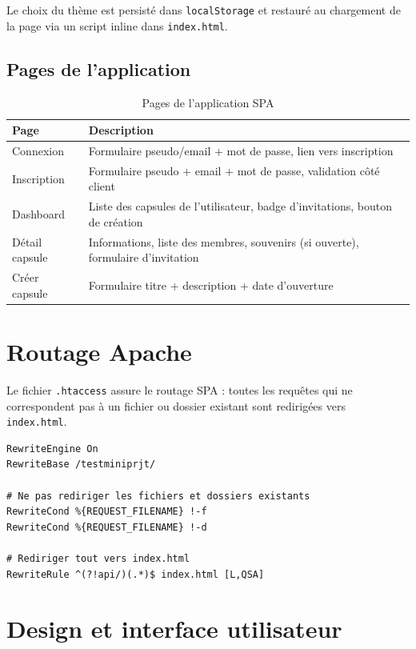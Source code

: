 \documentclass[12pt,a4paper]{report}
\begin{document}
Le choix du thème est persisté dans \texttt{localStorage} et restauré au chargement de la page via un script inline dans \texttt{index.html}.

\subsection{Pages de l'application}

\begin{table}[H]
    \centering
    \begin{tabularx}{\textwidth}{l X}
        \toprule
        \textbf{Page} & \textbf{Description} \\
        \midrule
        Connexion & Formulaire pseudo/email + mot de passe, lien vers inscription \\
        Inscription & Formulaire pseudo + email + mot de passe, validation côté client \\
        Dashboard & Liste des capsules de l'utilisateur, badge d'invitations, bouton de création \\
        Détail capsule & Informations, liste des membres, souvenirs (si ouverte), formulaire d'invitation \\
        Créer capsule & Formulaire titre + description + date d'ouverture \\
        \bottomrule
    \end{tabularx}
    \caption{Pages de l'application SPA}
\end{table}


\section{Routage Apache}

Le fichier \texttt{.htaccess} assure le routage SPA : toutes les requêtes qui ne correspondent pas à un fichier ou dossier existant sont redirigées vers \texttt{index.html}.

\begin{lstlisting}[caption={Configuration .htaccess pour le routage SPA}]
RewriteEngine On
RewriteBase /testminiprjt/

# Ne pas rediriger les fichiers et dossiers existants
RewriteCond %{REQUEST_FILENAME} !-f
RewriteCond %{REQUEST_FILENAME} !-d

# Rediriger tout vers index.html
RewriteRule ^(?!api/)(.*)$ index.html [L,QSA]
\end{lstlisting}

\section{Design et interface utilisateur}
\end{document}
